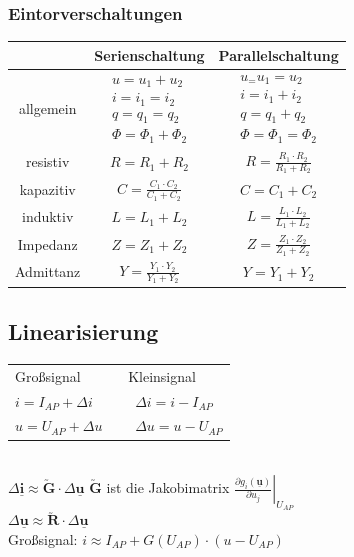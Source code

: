 \documentclass[6pt,a4paper]{scrartcl}
\newcommand{\ma}[1]{\ensuremath{\utilde{\boldsymbol {#1}}}}
\renewcommand{\vec}[1]{\ensuremath{\underline{\boldsymbol {#1}}}}
\begin{document}
\begin{multicols}{4}
	\subsubsection{Eintorverschaltungen}
	\begin{tabular}{c||c|c}
		& \large{Serienschaltung} & \large{Parallelschaltung} \\ \hline \hline
		allgemein & $\begin{array}{l} u=u_1+u_2 \\ i=i_1 = i_2 \\ q=q_1=q_2 \\ \Phi=\Phi_1 + \Phi_2  \end{array}$ & $\begin{array}{l} u_=u_1=u_2 \\ i=i_1+i_2 \\ q=q_1+q_2 \\ \Phi=\Phi_1 = \Phi_2 \end{array}$ \\ \hline
		resistiv & $R=R_1 + R_2$ & $R = \frac{R_1 \cdot R_2}{R_1 + R_2}$ \\
		kapazitiv & $C=\frac{C_1 \cdot C_2}{C_1 + C_2}$ & $C=C_1 + C_2$\\
		induktiv & $L=L_1 + L_2$ & $L=\frac{L_1 \cdot L_2}{L_1 + L_2}$ \\[0.5em]
		Impedanz & $Z=Z_1 + Z_2$ & $Z = \frac{Z_1 \cdot Z_2}{Z_1 + Z_2}$\\
		Admittanz & $Y=\frac{Y_1 \cdot Y_2}{Y_1 + Y_2}$ & $Y=Y_1 + Y_2$\\
	\end{tabular}


	\subsection{Linearisierung}
	\begin{tabular}{ll}
		Großsignal & Kleinsignal\\
		$i=I_{AP}+\Delta i$ \ &  \ $\Delta i= i - I_{AP}$\\
		$u=U_{AP}+\Delta u$ \ &  \ $\Delta u= u - U_{AP}$\\
	\end{tabular}
	\\
	$\Delta \vec i \approx \ma G \cdot \Delta \vec u$ \qquad $\ma G$ ist die Jakobimatrix $\left. \frac{\partial g_i(\vec u)}{\partial u_j} \right|_{U_{AP}}$\\
	$\Delta \vec u \approx \ma R \cdot \Delta \vec u$\\	
	Großsignal: $i \approx I_{AP} + G(U_{AP}) \cdot (u - U_{AP})$\\



\end{multicols}
\end{document}
